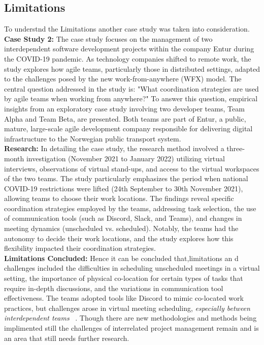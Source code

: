 \documentclass{llncs}
\begin{document}
\subsection{Limitations}
To understnd the Limitations another case study was taken into consideration.~\cite{refpaper9}
\textbf{Case Study 2:} The case study focuses on the management of two interdependent software development projects within the company Entur during the COVID-19 pandemic. As technology companies shifted to remote work, the study explores how agile teams, particularly those in distributed settings, adapted to the challenges posed by the new work-from-anywhere (WFX) model. The central question addressed in the study is: "What coordination strategies are used by agile teams when working from anywhere?" To answer this question, empirical insights from an exploratory case study involving two developer teams, Team Alpha and Team Beta, are presented. Both teams are part of Entur, a public, mature, large-scale agile development company responsible for delivering digital infrastructure to the Norwegian public transport system.\\
\textbf{Research:} In detailing the case study, the research method involved a three-month investigation (November 2021 to January 2022) utilizing virtual interviews, observations of virtual stand-ups, and access to the virtual workspaces of the two teams. The study particularly emphasizes the period when national COVID-19 restrictions were lifted (24th September to 30th November 2021), allowing teams to choose their work locations. The findings reveal specific coordination strategies employed by the teams, addressing task selection, the use of communication tools (such as Discord, Slack, and Teams), and changes in meeting dynamics (unscheduled vs. scheduled). Notably, the teams had the autonomy to decide their work locations, and the study explores how this flexibility impacted their coordination strategies.~\cite{refpaper9}~\cite{refpaper10} \\
\textbf{Limitations Concluded:} Hence it can be concluded that,limitations an d challenges included the difficulties in scheduling unscheduled meetings in a virtual setting, the importance of physical co-location for certain types of tasks that require in-depth discussions, and the variations in communication tool effectiveness. The teams adopted tools like Discord to mimic co-located work practices, but challenges arose in virtual meeting scheduling, \textit{especially between interdependent teams} ~\cite{refpaper9}. Though there are new methodologies and methods being implimented still the challenges of interrelated project management remain and is an area that still needs further research.
\end{document}
